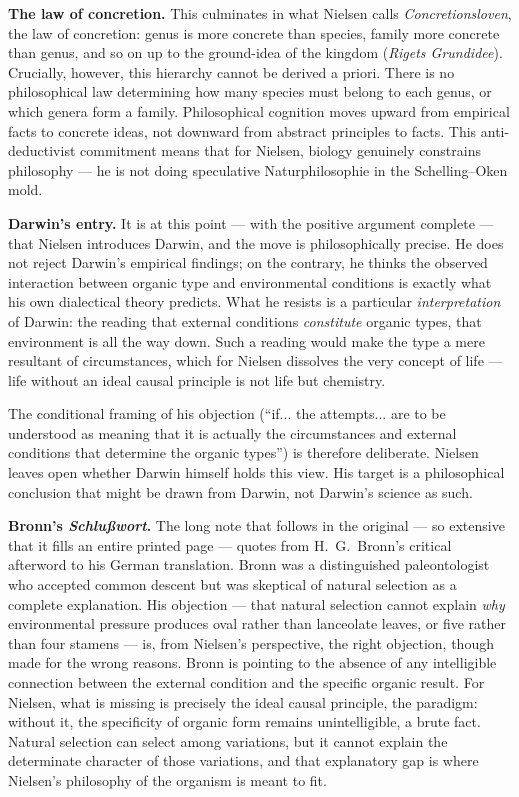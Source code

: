 \documentclass[12pt,a4paper]{article}
\begin{document}
\medskip\noindent\textbf{The law of concretion.} This culminates
in what Nielsen calls \emph{Concretionsloven}, the law of
concretion: genus is more concrete than species, family more
concrete than genus, and so on up to the ground-idea of the
kingdom (\emph{Rigets Grundidee}). Crucially, however, this
hierarchy cannot be derived a priori. There is no philosophical
law determining how many species must belong to each genus, or
which genera form a family. Philosophical cognition moves
upward from empirical facts to concrete ideas, not downward
from abstract principles to facts. This anti-deductivist
commitment means that for Nielsen, biology genuinely constrains
philosophy --- he is not doing speculative Naturphilosophie in
the Schelling--Oken mold.

\medskip\noindent\textbf{Darwin's entry.} It is at this point ---
with the positive argument complete --- that Nielsen introduces
Darwin, and the move is philosophically precise. He does not
reject Darwin's empirical findings; on the contrary, he thinks
the observed interaction between organic type and environmental
conditions is exactly what his own dialectical theory predicts.
What he resists is a particular \emph{interpretation} of Darwin:
the reading that external conditions \emph{constitute} organic
types, that environment is all the way down. Such a reading would
make the type a mere resultant of circumstances, which for Nielsen
dissolves the very concept of life --- life without an ideal causal
principle is not life but chemistry.

The conditional framing of his objection (``if... the attempts...
are to be understood as meaning that it is actually the
circumstances and external conditions that determine the organic
types'') is therefore deliberate. Nielsen leaves open whether
Darwin himself holds this view. His target is a philosophical
conclusion that might be drawn from Darwin, not Darwin's science
as such.

\medskip\noindent\textbf{Bronn's \emph{Schlußwort}.} The long
note that follows in the original --- so extensive that it fills
an entire printed page --- quotes from H.\ G.\ Bronn's critical
afterword to his German translation. Bronn was a distinguished
paleontologist who accepted common descent but was skeptical of
natural selection as a complete explanation. His objection ---
that natural selection cannot explain \emph{why} environmental
pressure produces oval rather than lanceolate leaves, or five
rather than four stamens --- is, from Nielsen's perspective, the
right objection, though made for the wrong reasons. Bronn is
pointing to the absence of any intelligible connection between
the external condition and the specific organic result. For
Nielsen, what is missing is precisely the ideal causal principle,
the paradigm: without it, the specificity of organic form
remains unintelligible, a brute fact. Natural selection can
select among variations, but it cannot explain the determinate
character of those variations, and that explanatory gap is where
Nielsen's philosophy of the organism is meant to fit.
\end{document}

